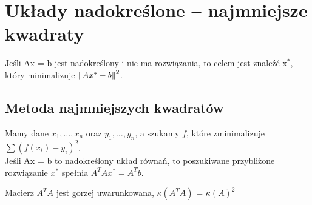 \section{Układy nadokreślone – najmniejsze kwadraty}
Jeśli Ax = b jest nadokreślony i nie ma rozwiązania, to celem jest znaleźć x\( ^* \), który minimalizuje \( \left\Vert Ax^* - b \right\Vert^2 \).

\subsection{Metoda najmniejszych kwadratów}
Mamy dane \( x_1, \dots, x_n \) oraz \( y_1, \dots, y_n \), a szukamy \( f \), które zminimalizuje \( \sum (f(x_i) - y_i)^2 \). \\
Jeśli Ax = b to nadokreślony układ równań, to poszukiwane przybliżone rozwiązanie \( x^* \) spełnia \( A^TAx^* = A^Tb \). \\
\begin{warning}
    Macierz \( A^TA \) jest gorzej uwarunkowana, \( \kappa(A^TA) \) = \( \kappa(A)^2 \)
\end{warning}